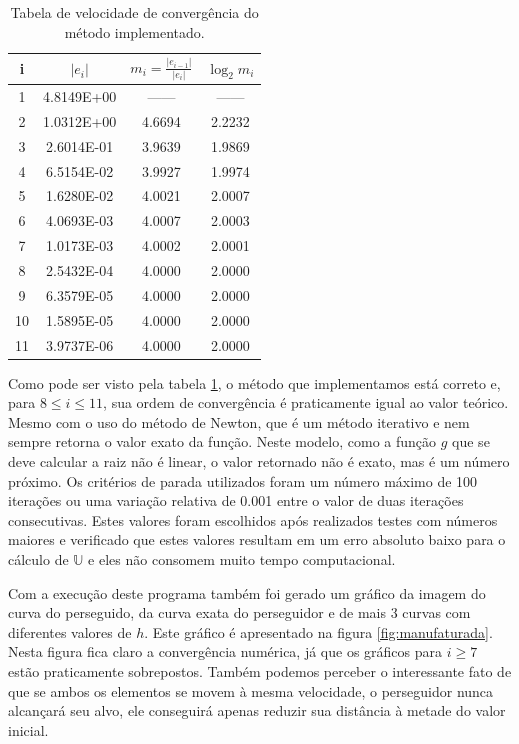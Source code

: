 \documentclass[a4paper,10pt]{article}
\begin{document}
  \begin{table}[ht]
    \begin{center}
      \begin{tabular}{|c || c c c|}
      \hline
      i &  $|e_{i}|$   & $m_{i} = \frac{|e_{i-1}|}{|e_{i}|}$ & $\log_{2}m_{i}$ \\
      \hline
      1 & 4.8149E+00 & ------ & ------ \\
      2 & 1.0312E+00 & 4.6694 & 2.2232 \\ 
      3 & 2.6014E-01 & 3.9639 & 1.9869 \\
      4 & 6.5154E-02 & 3.9927 & 1.9974 \\ 
      5 & 1.6280E-02 & 4.0021 & 2.0007 \\ 
      6 & 4.0693E-03 & 4.0007 & 2.0003 \\ 
      7 & 1.0173E-03 & 4.0002 & 2.0001 \\ 
      8 & 2.5432E-04 & 4.0000 & 2.0000 \\
      9 & 6.3579E-05 & 4.0000 & 2.0000 \\
      10 & 1.5895E-05 & 4.0000 & 2.0000 \\
      11 & 3.9737E-06 & 4.0000 & 2.0000 \\
      \hline
      \end{tabular} 	
    \end{center}
    \caption{Tabela de velocidade de convergência do método implementado.}
    \label{tab:convergencia}
  \end{table}
  
  Como pode ser visto pela tabela \ref{tab:convergencia}, o método que implementamos está correto e, para $8 \leq i \leq 11$, sua ordem de convergência é praticamente igual ao valor teórico. Mesmo com o uso do método de Newton, que é um método iterativo e nem sempre retorna o valor exato da função. Neste modelo, como a função $g$ que se deve calcular a raiz não é linear, o valor retornado não é exato, mas é um número próximo. Os critérios de parada utilizados foram um número máximo de 100 iterações ou uma variação relativa de 0.001 entre o valor de duas iterações consecutivas. Estes valores foram escolhidos após realizados testes com números maiores e verificado que estes valores resultam em um erro absoluto baixo para o cálculo de $\mathbb{U}$ e eles não consomem muito tempo computacional.
  
  Com a execução deste programa também foi gerado um gráfico da imagem do curva do perseguido, da curva exata do perseguidor e de mais 3 curvas com diferentes valores de $h$. Este gráfico é apresentado na figura \ref{fig:manufaturada}. Nesta figura fica claro a convergência numérica, já que os gráficos para $ i \geqslant 7$ estão praticamente sobrepostos. Também podemos perceber o interessante fato de que se ambos os elementos se movem à mesma velocidade, o perseguidor nunca alcançará seu alvo, ele conseguirá apenas reduzir sua distância à metade do valor inicial.
  
\end{document}
